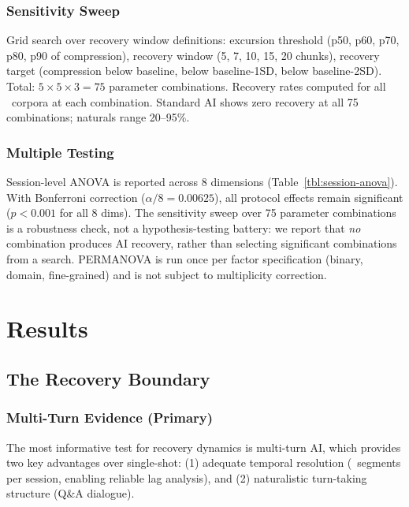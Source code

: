 \documentclass[final]{clv2025}
\begin{document}
\subsubsection{Sensitivity Sweep}

Grid search over recovery window definitions: excursion threshold (p50, p60, p70, p80, p90 of compression), recovery window (5, 7, 10, 15, 20 chunks), recovery target (compression below baseline, below baseline-1SD, below baseline-2SD). Total: $5 \times 5 \times 3 = 75$ parameter combinations. Recovery rates computed for all \nCorpora\ corpora at each combination. Standard AI shows zero recovery at all 75 combinations; naturals range 20--95\%.

\subsubsection{Multiple Testing}

Session-level ANOVA is reported across 8 dimensions (Table~\ref{tbl:session-anova}). With Bonferroni correction ($\alpha / 8 = 0.00625$), all protocol effects remain significant ($p < 0.001$ for all 8 dims). The sensitivity sweep over 75 parameter combinations is a robustness check, not a hypothesis-testing battery: we report that \textit{no} combination produces AI recovery, rather than selecting significant combinations from a search. PERMANOVA is run once per factor specification (binary, domain, fine-grained) and is not subject to multiplicity correction.


\section{Results}

\subsection{The Recovery Boundary}

\subsubsection{Multi-Turn Evidence (Primary)}

The most informative test for recovery dynamics is multi-turn AI, which provides two key advantages over single-shot: (1) adequate temporal resolution (\nMultiturnSegments\ segments per session, enabling reliable lag analysis), and (2) naturalistic turn-taking structure (Q\&A dialogue).
\end{document}
